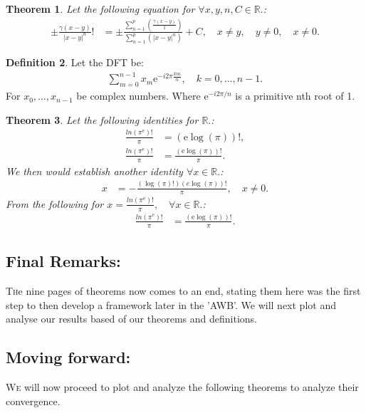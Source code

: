 \documentclass[10pt]{article}
\theoremstyle{plain}
\newtheorem{theorem}{Theorem}[section]
\theoremstyle{definition}
\newtheorem{definition}[theorem]{Definition}
\theoremstyle{remark}
\begin{document}
\begin{theorem}
	Let the following equation for $\forall x, y, n, C \in \mathbb{R}.$:
	\begin{align*}
		\pm \frac{\gamma(x-y)}{|x - y|^{n}}! &= \pm \frac{\sum_{n=1}^{p}(\frac{\gamma(x-y)}{1})}{\sum_{n=1}^{p}(|x - y|^{n})} + C, \quad x \neq y, \quad y \neq 0, \quad x \neq 0.
	\end{align*}
\end{theorem}

\begin{definition}
	Let the DFT be:
	\begin{align*}
		\sum_{m=0}^{n-1} x_{m}\mathrm{e}^{-i2\pi \frac{km}{n}}, \quad k = 0,\dots,n-1.
	\end{align*}
	For $x_{0}, \dots, x_{n-1}$ be complex numbers. Where $\mathrm{e}^{-i2\pi /n}$ is a primitive nth root of 1.
\end{definition}

\begin{theorem}
	Let the following identities for $\mathbb{R}.$:
	\begin{align*}
		\frac{ln(\pi^\mathrm{e})!}{\pi} &= (\mathrm{e} \log(\pi))!,\\
		\frac{ln(\pi^\mathrm{e})!}{\pi} &= \frac{(\mathrm{e} \log(\pi))!}{\pi}.
	\end{align*}
	We then would establish another identity $\forall x \in \mathbb{R}.$:
	\begin{align*}
		x &= -\frac{(\log(\pi)!) (e \log(\pi))!}{\pi}, \quad x \neq 0.
	\end{align*}
	From the following for $x = \frac{ln(\pi^\mathrm{e})!}{\pi}, \quad \forall x \in \mathbb{R}.$:
	\begin{align*}
		\frac{ln(\pi^\mathrm{e})!}{\pi} &= \frac{(\mathrm{e} \log(\pi))!}{\pi}.
	\end{align*}
\end{theorem}

\subsection{Final Remarks:}

\lettrine[lines=2, lhang=0.1, loversize=0.2]{T}he nine pages of theorems now comes to an end, stating them here was the first step to then develop a framework later in the 'AWB'. We will next plot and analyse our results based of our theorems and definitions.

\subsection{Moving forward:}
\lettrine[lines=2, lhang=0.1, loversize=0.2]{W}e will now proceed to plot and analyze the following theorems to analyze their convergence.
\end{document}
